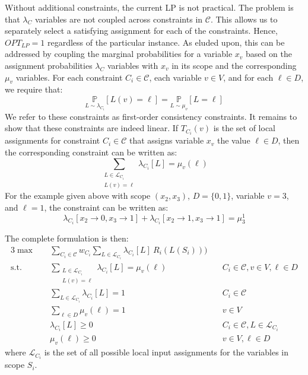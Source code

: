 Without additional constraints, the current LP is not practical. 
The problem is that $\lambda_C$ variables are not coupled across constraints in $\mathcal{C}$. 
This allows us to separately select a satisfying assignment for each of the constraints. 
Hence, $OPT_{LP} = 1$ regardless of the particular instance. 
As eluded upon, this can be addressed by coupling the marginal probabilities for a variable $x_v$ based on the assignment probabilities $\lambda_C$ variables with $x_v$ in its scope and the corresponding $\mu_v$ variables.
For each constraint $C_i \in \mathcal{C}$, each variable $v \in V$, and for each $ \ell \in D$, we require that:
\[
	\underset{L \sim \lambda_{C_i} }{\mathbb{P}}[ L(v) = \ell] = \underset{L \sim \mu_v }{\mathbb{P}}[ L = \ell]
\]
We refer to these constraints as first-order consistency constraints.
It remains to show that these constraints are indeed linear.
If $T_{C_i}(v)$ is the set of local assignments for constraint $C_i \in \mathcal{C}$ that assigns variable $x_v$  the value $\ell \in D$, then the corresponding constraint can be written as:
\[
	\sum_{\substack{L \in \mathcal{L}_{C_i}\\ L(v) = \ell}} \lambda_{C_i}[L] = \mu_v(\ell)
\]
For the example given above with scope $(x_2,x_3)$, $D = \{0,1\}$, variable $v = 3$, and $ \ell = 1$, the constraint can be written as:
\[
	\lambda_{C_i}[x_2 \rightarrow 0, x_3 \rightarrow 1] + \lambda_{C_i}[x_2 \rightarrow 1, x_3 \rightarrow 1] = \mu_3^1
\]

The complete formulation is then:
\begin{alignat}{3}
\max \quad & \sum_{C_i \in \mathcal{C}} w_{C_i} \sum_{ L \in \mathcal{L}_{C_i} }  \lambda_{C_i}[L] \  R_i(L(S_i))) \label{eq:lp_strong}\\
\text{s.t.} \quad & 	\sum_{\substack{L \in \mathcal{L}_{C_i}\\ L(v) = \ell }} \lambda_{C_i}[L] = \mu_v(\ell) & \quad C_i \in \mathcal{C}, v \in V, \ell \in D \nonumber \\
& \sum_{L \in \mathcal{L}_{C_i}} \lambda_{C_i}[ L ] = 1 & \quad  C_i \in \mathcal{C} \nonumber\\
& \sum_{\ell \in D} \mu_v(\ell) = 1 & \quad v \in V \nonumber\\
& \lambda_{C_i}[ L ] \ge 0 & \quad C_i \in \mathcal{C}, L \in \mathcal{L}_{C_i} \nonumber\\
&	\mu_v(\ell) \ge 0	& \quad v \in  V, \ell \in D \nonumber
\end{alignat}
where $\mathcal{L}_{C_i}$ is the set of all possible local input assignments for the variables in scope $S_i$.

